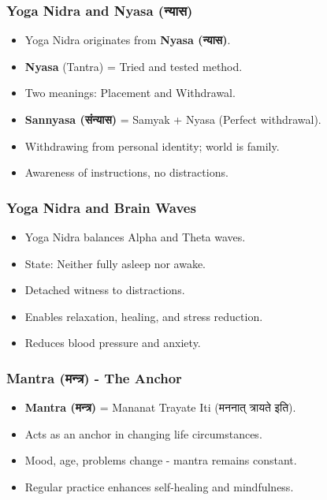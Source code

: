 \begin{frame}[fragile]\frametitle{Yoga Nidra and Nyasa (न्यास)}
      \begin{itemize}
        \item Yoga Nidra originates from \textbf{Nyasa (न्यास)}.
        \item \textbf{Nyasa} (Tantra) = Tried and tested method.
        \item Two meanings: Placement and Withdrawal.
        \item \textbf{Sannyasa (संन्यास)} = Samyak + Nyasa (Perfect withdrawal).
        \item Withdrawing from personal identity; world is family.
        \item Awareness of instructions, no distractions.
      \end{itemize}
\end{frame}

\begin{frame}[fragile]\frametitle{Yoga Nidra and Brain Waves}
      \begin{itemize}
        \item Yoga Nidra balances Alpha and Theta waves.
        \item State: Neither fully asleep nor awake.
        \item Detached witness to distractions.
        \item Enables relaxation, healing, and stress reduction.
        \item Reduces blood pressure and anxiety.
      \end{itemize}
\end{frame}

\begin{frame}[fragile]\frametitle{Mantra (मन्त्र) - The Anchor}
      \begin{itemize}
        \item \textbf{Mantra (मन्त्र)} = Mananat Trayate Iti (मननात् त्रायते इति).
        \item Acts as an anchor in changing life circumstances.
        \item Mood, age, problems change - mantra remains constant.
        \item Regular practice enhances self-healing and mindfulness.
      \end{itemize}
\end{frame}

